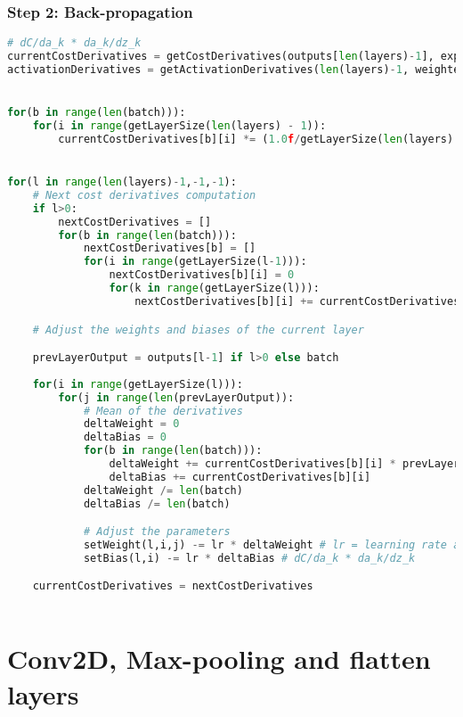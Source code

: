 \documentclass[11pt,a4paper]{report}
\begin{document}
\subsubsection{Step 2: Back-propagation}
\begin{lstlisting}[language=Python]
# dC/da_k * da_k/dz_k
currentCostDerivatives = getCostDerivatives(outputs[len(layers)-1], expectedOutput, len(batch)) # Matrix of dC/da_k for all batch item and for all k
activationDerivatives = getActivationDerivatives(len(layers)-1, weightedSums[getNbLayers()-1], len(batch)) # Matrix of da_k/dz_k for all batch item and for all k


for(b in range(len(batch))):
    for(i in range(getLayerSize(len(layers) - 1)):
        currentCostDerivatives[b][i] *= (1.0f/getLayerSize(len(layers) - 1) * activationDerivatives[b][i];


for(l in range(len(layers)-1,-1,-1):
    # Next cost derivatives computation
    if l>0:
        nextCostDerivatives = []
        for(b in range(len(batch))):
            nextCostDerivatives[b] = []
            for(i in range(getLayerSize(l-1))):
                nextCostDerivatives[b][i] = 0
                for(k in range(getLayerSize(l))):
                    nextCostDerivatives[b][i] += currentCostDerivatives[b][k] * getWeight(l,k,i) # dC/da_k * da_k/dz_k * dz_k/da_i

    # Adjust the weights and biases of the current layer

    prevLayerOutput = outputs[l-1] if l>0 else batch
    
    for(i in range(getLayerSize(l))):
        for(j in range(len(prevLayerOutput)):
            # Mean of the derivatives
            deltaWeight = 0
            deltaBias = 0
            for(b in range(len(batch))):
                deltaWeight += currentCostDerivatives[b][i] * prevLayerOutput[b][j]
                deltaBias += currentCostDerivatives[b][i]
            deltaWeight /= len(batch)
            deltaBias /= len(batch)

            # Adjust the parameters
            setWeight(l,i,j) -= lr * deltaWeight # lr = learning rate and we have dC/da_k * da_k/dz_k * dz_k/dw_i,j
            setBias(l,i) -= lr * deltaBias # dC/da_k * da_k/dz_k

    currentCostDerivatives = nextCostDerivatives
   
\end{lstlisting}

\newpage
\section{Conv2D, Max-pooling and flatten layers}
\end{document}
